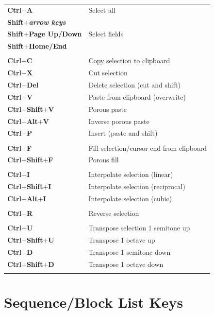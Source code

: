 \documentclass[12pt]{report}	%
\begin{document}
\begin{longtable}{p{} p{} }
\\
\textbf{Ctrl\(\bm{+}\)A} & Select all \\
\textbf{Shift\(\bm{+}\)\textit{arrow keys}} &\\
\textbf{Shift\(\bm{+}\)Page Up/Down} & Select fields\\
\textbf{Shift\(\bm{+}\)Home/End} & \\
\\
\textbf{Ctrl\(\bm{+}\)C} & Copy selection to clipboard \\
\textbf{Ctrl\(\bm{+}\)X} & Cut selection \\
\textbf{Ctrl\(\bm{+}\)Del} & Delete selection (cut and shift) \\
\textbf{Ctrl\(\bm{+}\)V} & Paste from clipboard (overwrite) \\
\textbf{Ctrl\(\bm{+}\)Shift\(\bm{+}\)V} & Porous paste \\
\textbf{Ctrl\(\bm{+}\)Alt\(\bm{+}\)V} & Inverse porous paste \\
\textbf{Ctrl\(\bm{+}\)P} & Insert (paste and shift) \\
\\
\textbf{Ctrl\(\bm{+}\)F} & Fill selection/cursor-end from clipboard \\
\textbf{Ctrl\(\bm{+}\)Shift\(\bm{+}\)F} & Porous fill \\
\\
\textbf{Ctrl\(\bm{+}\)I} & Interpolate selection (linear) \\
\textbf{Ctrl\(\bm{+}\)Shift\(\bm{+}\)I} & Interpolate selection (reciprocal) \\
\textbf{Ctrl\(\bm{+}\)Alt\(\bm{+}\)I} & Interpolate selection (cubic) \\
\\
\textbf{Ctrl\(\bm{+}\)R} & Reverse selection \\
\\
\textbf{Ctrl\(\bm{+}\)U} & Transpose selection 1 semitone up \\
\textbf{Ctrl\(\bm{+}\)Shift\(\bm{+}\)U} & Transpose 1 octave up \\
\textbf{Ctrl\(\bm{+}\)D} & Transpose 1 semitone down \\
\textbf{Ctrl\(\bm{+}\)Shift\(\bm{+}\)D} & Transpose 1 octave down \\
\\
\end{longtable}


\section{Sequence/Block List Keys}
\end{document}
